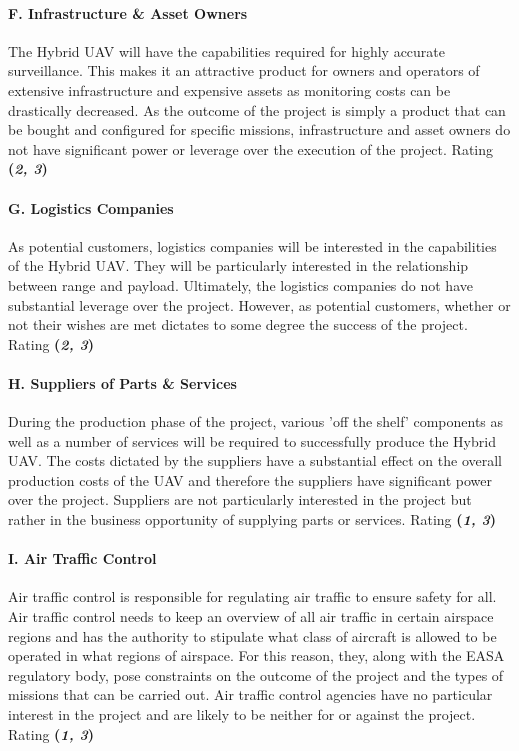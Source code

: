 \paragraph{F. Infrastructure \& Asset Owners}
The Hybrid UAV will have the capabilities required for highly accurate surveillance. This makes it an attractive product for owners and operators of extensive infrastructure and expensive assets as monitoring costs can be drastically decreased. As the outcome of the project is simply a product that can be bought and configured for specific missions, infrastructure and asset owners do not have significant power or leverage over the execution of the project. Rating \textbf{(\textit{2, 3})} 

\paragraph{G. Logistics Companies}
As potential customers, logistics companies will be interested in the capabilities of the Hybrid UAV. They will be particularly interested in the relationship between range and payload. Ultimately, the logistics companies do not have substantial leverage over the project. However, as potential customers, whether or not their wishes are met dictates to some degree the success of the project. Rating \textbf{(\textit{2, 3})} 

\paragraph{H. Suppliers of Parts \& Services}
During the production phase of the project, various 'off the shelf' components as well as a number of services will be required to successfully produce the Hybrid UAV. The costs dictated by the suppliers have a substantial effect on the overall production costs of the UAV and therefore the suppliers have significant power over the project. Suppliers are not particularly interested in the project but rather in the business opportunity of supplying parts or services. Rating \textbf{(\textit{1, 3})} 

\paragraph{I. Air Traffic Control}
Air traffic control is responsible for regulating air traffic to ensure safety for all. Air traffic control needs to keep an overview of all air traffic in certain airspace regions and has the authority to stipulate what class of aircraft is allowed to be operated in what regions of airspace. For this reason, they, along with the EASA regulatory body, pose constraints on the outcome of the project and the types of missions that can be carried out. Air traffic control agencies have no particular interest in the project and are likely to be neither for or against the project. Rating \textbf{(\textit{1, 3})}

